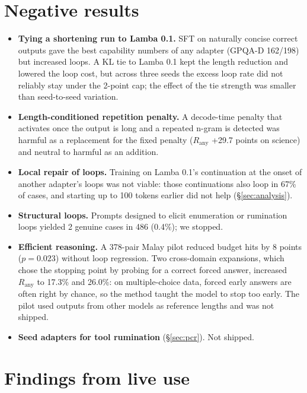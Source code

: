 \documentclass[11pt]{article}
\newcommand{\Rany}{R_{\text{any}}}
\begin{document}
\section{Negative results}
\label{sec:negative}

\begin{itemize}
  \item \textbf{Tying a shortening run to Lamba 0.1.} SFT on naturally concise correct outputs gave the best capability numbers of any adapter (GPQA-D 162/198) but increased loops. A KL tie to Lamba 0.1 kept the length reduction and lowered the loop cost, but across three seeds the excess loop rate did not reliably stay under the 2-point cap; the effect of the tie strength was smaller than seed-to-seed variation.
  \item \textbf{Length-conditioned repetition penalty.} A decode-time penalty that activates once the output is long and a repeated n-gram is detected was harmful as a replacement for the fixed penalty ($\Rany$ +29.7 points on science) and neutral to harmful as an addition.
  \item \textbf{Local repair of loops.} Training on Lamba 0.1's continuation at the onset of another adapter's loops was not viable: those continuations also loop in 67\% of cases, and starting up to 100 tokens earlier did not help (\S\ref{sec:analysis}).
  \item \textbf{Structural loops.} Prompts designed to elicit enumeration or rumination loops yielded 2 genuine cases in 486 (0.4\%); we stopped.
  \item \textbf{Efficient reasoning.} A 378-pair Malay pilot reduced budget hits by 8 points ($p=0.023$) without loop regression. Two cross-domain expansions, which chose the stopping point by probing for a correct forced answer, increased $\Rany$ to 17.3\% and 26.0\%: on multiple-choice data, forced early answers are often right by chance, so the method taught the model to stop too early. The pilot used outputs from other models as reference lengths and was not shipped.
  \item \textbf{Seed adapters for tool rumination} (\S\ref{sec:pcr}). Not shipped.
\end{itemize}

\section{Findings from live use}
\end{document}
